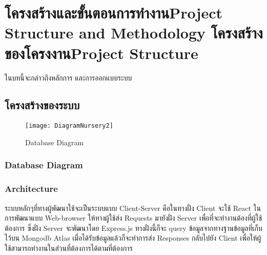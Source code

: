\chapter{\ifproject%
\ifcpe โครงสร้างและขั้นตอนการทำงาน\else Project Structure and Methodology\fi
\else%
\ifcpe โครงสร้างของโครงงาน\else Project Structure\fi
\fi
}

ในบทนี้จะกล่าวถึงหลักการ และการออกแบบระบบ

\makeatletter


\makeatother

\section{โครงสร้างของระบบ}

\begin{figure}
\begin{center}
\texttt{[image: DiagramNursery2]}
\end{center}
\caption[Poem]{Database Diagram}
\label{fig:walrus}
\end{figure}

\subsection{Database Diagram}


\subsection{Architecture}
ระบบหลักๆที่ทางผู้พัฒนาใช้จะเป็นระบบแบบ Client-Server คือในทางฝั่ง Client จะใช้ React ในการพัฒนาแบบ Web-browser ให้ทางผู้ใช้ส่ง Requests มายังฝั่ง Server เพื่อที่จะทำงานต้องที่ผู้ใช้ต้องการ ซึ่งฝั่ง Server 
จะพัฒนาโดย Express.js ทางฝั่งนี้ก็จะ query ข้อมูลจากทางฐานข้อมูลที่เก็บไว้บน Mongodb Atlas เมื่อได้รับข้อมูลแล้วก็จะทำการส่ง Responses กลับไปยัง Client เพื่อให้ผู้ใช้สามารถทำงานในส่วนที่ต้องการได้ตามที่ต้องการ


